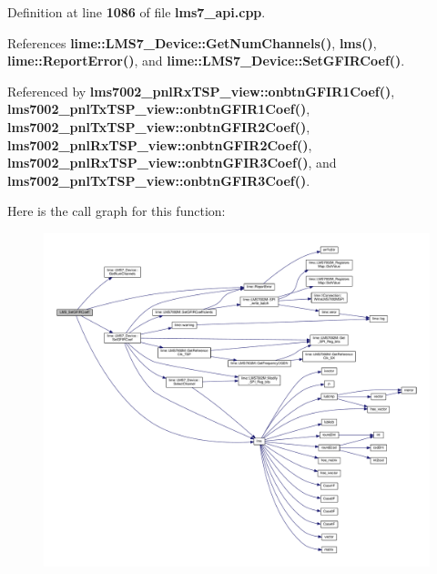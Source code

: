 Definition at line {\bf 1086} of file {\bf lms7\+\_\+api.\+cpp}.



References {\bf lime\+::\+L\+M\+S7\+\_\+\+Device\+::\+Get\+Num\+Channels()}, {\bf lms()}, {\bf lime\+::\+Report\+Error()}, and {\bf lime\+::\+L\+M\+S7\+\_\+\+Device\+::\+Set\+G\+F\+I\+R\+Coef()}.



Referenced by {\bf lms7002\+\_\+pnl\+Rx\+T\+S\+P\+\_\+view\+::onbtn\+G\+F\+I\+R1\+Coef()}, {\bf lms7002\+\_\+pnl\+Tx\+T\+S\+P\+\_\+view\+::onbtn\+G\+F\+I\+R1\+Coef()}, {\bf lms7002\+\_\+pnl\+Tx\+T\+S\+P\+\_\+view\+::onbtn\+G\+F\+I\+R2\+Coef()}, {\bf lms7002\+\_\+pnl\+Rx\+T\+S\+P\+\_\+view\+::onbtn\+G\+F\+I\+R2\+Coef()}, {\bf lms7002\+\_\+pnl\+Rx\+T\+S\+P\+\_\+view\+::onbtn\+G\+F\+I\+R3\+Coef()}, and {\bf lms7002\+\_\+pnl\+Tx\+T\+S\+P\+\_\+view\+::onbtn\+G\+F\+I\+R3\+Coef()}.



Here is the call graph for this function\+:
\nopagebreak
\begin{figure}[H]
\begin{center}
\leavevmode
\includegraphics[width=350pt]{df/de1/lms7__api_8cpp_ad9538f07489ca171e270728fa1f6cc32_cgraph}
\end{center}
\end{figure}




